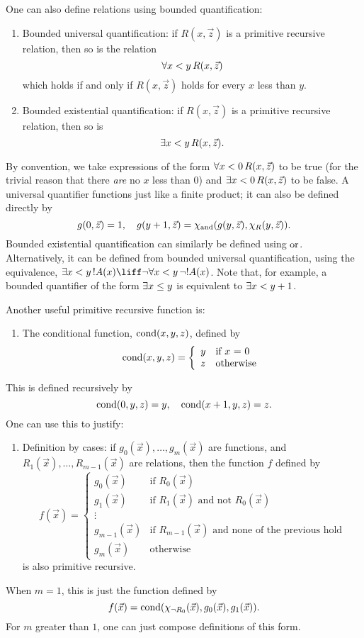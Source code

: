 \documentclass[../../../include/open-logic-section]{subfiles}
\begin{document}
One can also define relations using bounded quantification:
\begin{enumerate}
\item Bounded universal quantification: if $R(x, \vec z)$ is a
primitive recursive relation, then so is the relation
\[
\lforall[x < y][R(x, \vec z)]
\]
which holds if and only if $R(x,\vec z)$ holds for every $x$ less than
$y$.
\item Bounded existential quantification: if $R(x, \vec z)$ is a
primitive recursive relation, then so is
\[
\lexists[x < y][R(x, \vec z)].
\]
\end{enumerate}
By convention, we take expressions of the form $\lforall[x < 0][R(x,\vec
z)]$ to be true (for the trivial reason that there \emph{are} no $x$
less than $0$) and $\lexists[x < 0][R(x,\vec z)]$ to be false. A universal
quantifier functions just like a finite product; it can also be
defined directly by
\[
g(0,\vec z) = 1, \quad g(y+1,\vec z) = \chi_{\mathrm{and}}(g(y,\vec
z),\chi_{R}(y,\vec z)).
\]
Bounded existential quantification can similarly be defined using
$\mathrm{or}$. Alternatively, it can be defined from bounded universal
quantification, using the equivalence, $\lexists[x < y][!A(x)] \liff \lnot
\lforall[x < y][\lnot !A(x)]$. Note that, for example, a bounded quantifier
of the form $\lexists[x \leq y]$ is equivalent to $\lexists[x < y+1]$.

Another useful primitive recursive function is:
\begin{enumerate}
\item The conditional function, $\mathrm{cond}(x,y,z)$, defined by
\[
\fn{cond}(x,y,z) = \left\{ \begin{array}{ll}
  y & \mbox{if $x$ = 0} \\
  z & \mbox{otherwise}
\end{array}\right.
\]
\end{enumerate}
This is defined recursively by
\[
\mathrm{cond}(0,y,z) = y, \quad \mathrm{cond}(x+1,y,z) = z.
\]
One can use this to justify:
\begin{enumerate}
\item Definition by cases: if $g_0(\vec x), \dots, g_m(\vec x)$ are
functions, and $R_1(\vec x), \dots, R_{m-1}(\vec x)$ are relations, then
the function $f$ defined by
\[
f(\vec x) = \left\{\begin{array}{ll}
    g_0(\vec x) & \mbox{if $R_0(\vec{x})$} \\
    g_1(\vec x) & \mbox{if $R_1(\vec{x})$ and not $R_0(\vec{x})$} \\
    \vdots & \\
    g_{m-1}(\vec x) & \mbox{if $R_{m-1}(\vec{x})$ and none of the
      previous hold}
    \\
    g_m(\vec x) & \mbox{otherwise}
\end{array}\right.
\]
is also primitive recursive.
\end{enumerate}
When $m = 1$, this is just the function defined by
\[
f(\vec x) = \mathrm{cond}(\chi_{\lnot R_0}(\vec x),g_0(\vec x),g_1(\vec
 x)).
\]
For $m$ greater than $1$, one can just compose definitions of this
form.
\end{document}
